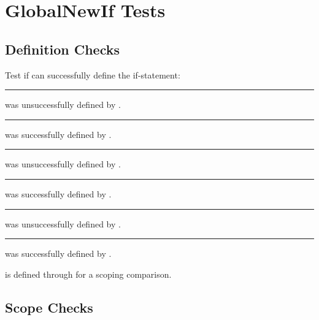 \chapter{GlobalNewIf Tests}

\section{Definition Checks}


Test if  can successfully define the if-statement:\\
\ifx \ifTestIfa \UnDefined
    \rule{2em}{0pt} was unsuccessfully defined by .
\else
    \rule{2em}{0pt} was successfully defined by .
\fi\\
%
\ifx \TestIfatrue \UnDefined
    \rule{2em}{0pt} was unsuccessfully defined by .
\else
    \rule{2em}{0pt} was successfully defined by .
\fi\\
%
\ifx \TestIfafalse \UnDefined
    \rule{2em}{0pt} was unsuccessfully defined by .
\else
    \rule{2em}{0pt} was successfully defined by .
\fi


\newif\ifTestIfb
{} is defined through  for a scoping comparison.





\section{Scope Checks}
\TestIfatrue
\TestIfbtrue

